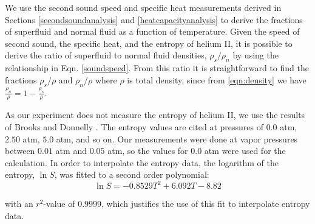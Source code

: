 We use the second sound speed and specific heat measurements derived
in Sections \ref{secondsoundanalysis} and \ref{heatcapacityanalysis}
to derive the fractions of superfluid and normal fluid as a function
of temperature. Given the speed of second sound, the specific heat,
and the entropy of helium II, it is possible to derive the ratio of
superfluid to normal fluid densities, $\rho_s/\rho_n$ by using the
relationship in Eqn. \ref{soundspeed}. From this ratio it is
straightforward to find the fractions $\rho_s/\rho$ and $\rho_n/\rho$
where $\rho$ is total density, since from \ref{eqn:density} we have
$\frac{\rho_n}{\rho} = 1 - \frac{\rho_s}{\rho}$.

As our experiment does not measure the entropy of helium II, we use the
results of Brooks and Donnelly \cite{brooks}. The entropy
values are cited at pressures of $0.0$ atm, $2.50$ atm, $5.0$ atm, and so on. Our
measurements were done at vapor pressures between $0.01$ atm and
$0.05$ atm, so the values for $0.0$ atm were used for the calculation.
In order to interpolate the entropy data, the logarithm of the
entropy, $\ln S$, was fitted to a second order polynomial:
\begin{equation}
\ln S = -0.8529T^2 + 6.092T - 8.82
\end{equation}

with an $r^2$-value of $0.9999$, which justifies the use of this fit
to interpolate entropy data.

